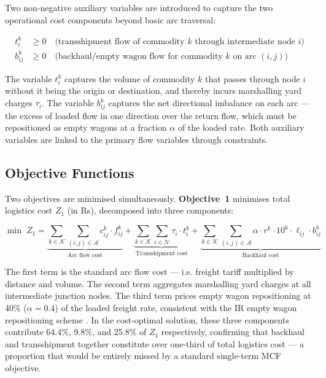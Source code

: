 \documentclass[11pt, a4paper]{article}
\numberwithin{equation}{section}
\numberwithin{figure}{section}
\numberwithin{table}{section}
\begin{document}
Two non-negative auxiliary variables are introduced to capture the two operational cost
components beyond basic arc traversal:

\begin{align}
    t^k_i &\geq 0
    \quad \text{(transshipment flow of commodity } k \text{ through intermediate node } i \text{)} \\
    b^k_{ij} &\geq 0
    \quad \text{(backhaul/empty wagon flow for commodity } k \text{ on arc } (i,j) \text{)}
\end{align}

The variable $t^k_i$ captures the volume of commodity $k$ that passes through node $i$
without it being the origin or destination, and thereby incurs marshalling yard
charges $\tau_i$. The variable $b^k_{ij}$ captures the net directional imbalance on
each arc — the excess of loaded flow in one direction over the return flow, which must
be repositioned as empty wagons at a fraction $\alpha$ of the loaded rate. Both
auxiliary variables are linked to the primary flow variables through constraints.

\subsection{Objective Functions}

Two objectives are minimised simultaneously. \textbf{Objective~1} minimises total
logistics cost $Z_1$ (in Rs), decomposed into three components:

\begin{equation}
    \min\; Z_1 =
    \underbrace{\sum_{k \in \mathcal{K}} \sum_{(i,j) \in \mathcal{A}} c^k_{ij} \cdot f^k_{ij}}_{\text{Arc flow cost}}
    + \underbrace{\sum_{k \in \mathcal{K}} \sum_{i \in \mathcal{N}} \tau_i \cdot t^k_i}_{\text{Transshipment cost}}
    + \underbrace{\sum_{k \in \mathcal{K}} \sum_{(i,j) \in \mathcal{A}}
      \alpha \cdot r^k \cdot 10^6 \cdot \ell_{ij} \cdot b^k_{ij}}_{\text{Backhaul cost}}
    \label{eq:Z1}
\end{equation}

The first term is the standard arc flow cost — i.e. freight tariff multiplied by distance
and volume. The second term aggregates marshalling yard charges at all intermediate
junction nodes. The third term prices empty wagon repositioning at 40\% ($\alpha = 0.4$)
of the loaded freight rate, consistent with the IR empty wagon repositioning scheme
\cite{iryearbook2023}. In the cost-optimal solution, these three components contribute
64.4\%, 9.8\%, and 25.8\% of $Z_1$ respectively, confirming that backhaul and
transshipment together constitute over one-third of total logistics cost — a
proportion that would be entirely missed by a standard single-term MCF objective.
\end{document}

